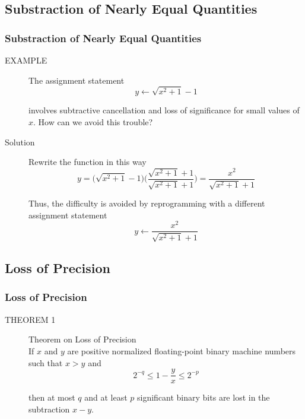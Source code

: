 \documentclass[notheorems,mathserif,table,compress]{beamer}  %
\begin{document}
\subsection{Substraction of Nearly Equal Quantities} 

\begin{frame}
\frametitle{Substraction of Nearly Equal Quantities}
\begin{description}
\item[EXAMPLE] The assignment statement
\begin{displaymath}
y\leftarrow\sqrt{x^2+1}-1
\end{displaymath}

involves subtractive cancellation and loss of significance for small values of $x$. How can we avoid this trouble?
\item[Solution] Rewrite the function in this way 
\begin{displaymath}
y=\Big(\sqrt{x^2+1}-1\Big)\bigg(\frac{\sqrt{x^2+1}+1}{\sqrt{x^2+1}+1}\bigg)=\frac{x^2}{\sqrt{x^2+1}+1}
\end{displaymath}

Thus, the difficulty is avoided by reprogramming with a different assignment statement
\begin{displaymath}
y\leftarrow\frac{x^2}{\sqrt{x^2+1}+1}
\end{displaymath}

\end{description}
\end{frame}

\subsection{Loss of Precision}

\begin{frame}
\frametitle{Loss of Precision}
\begin{description}
\item[THEOREM 1] \textsf{Theorem on Loss of Precision}\\
If $x$ and $y$ are positive normalized floating-point binary machine numbers such that $x>y$ and 
\begin{displaymath}
2^{-q}\leq{1-\frac{y}{x}}\leq 2^{-p}
\end{displaymath}

then at most $q$ and at least $p$ significant binary bits are lost in the subtraction $x-y$.
\end{description}
\end{frame}
\end{document}
